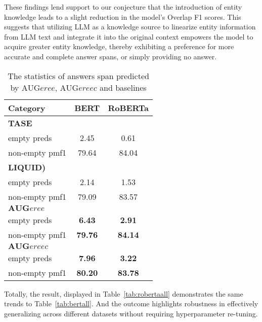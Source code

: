 These findings lend support to our conjecture that the introduction of entity knowledge leads to a slight reduction in the model's Overlap F1 scores. This suggests that utilizing LLM as a knowledge source to linearize entity information from LLM text and integrate it into the original context empowers the model to acquire greater entity knowledge, thereby exhibiting a preference for more accurate and complete answer spans, or simply providing no answer.



\begin{table}[htbp]
	\caption{The statistics of answers span predicted by $\text{AUG}{eree}$, $\text{AUG}{ereec}$ and baselines}
	\label{tab:answer_counts_vertical}
	\centering
	\begin{tabular}{lcc}
		\toprule
		\textbf{Category} & \textbf{BERT} & \textbf{RoBERTa} \\
		\midrule
		\multicolumn{3}{l}{\textbf{TASE}} \\
		\hspace{5mm} empty preds & 2.45 & 0.61 \\
		\hspace{5mm} non-empty pmf1 & 79.64 & 84.04 \\
		\multicolumn{3}{l}{\textbf{LIQUID)}} \\
		\hspace{5mm} empty preds & 2.14 & 1.53 \\
		\hspace{5mm} non-empty pmf1 & 79.09 & 83.57 \\
		\multicolumn{3}{l}{$\textbf{AUG}{eree}$ } \\
		\hspace{5mm} empty preds & \textbf{6.43} & \textbf{2.91} \\
		\hspace{5mm} non-empty pmf1 & \textbf{79.76} & \textbf{84.14} \\
		\multicolumn{3}{l}{$\textbf{AUG}{ereec}$ } \\
		\hspace{5mm} empty preds & \textbf{7.96} & \textbf{3.22} \\
		\hspace{5mm} non-empty pmf1 & \textbf{80.20} & \textbf{83.78} \\
		\bottomrule
	\end{tabular}
\end{table}



Totally, the result, displayed in Table~\ref{tab:robertaall} demonstrates the same trends to Table~\ref{tab:bertall}. And the outcome highlights robustness in effectively generalizing across different datasets without requiring hyperparameter re-tuning. 

